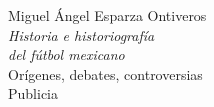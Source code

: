 \documentclass[11pt,a5paper,twoside]{book} %
\begin{document}
\setcounter{page}{1} %
\parindent=5mm %
\parskip=0mm %



%



\pagestyle{empty}
\begin{titlepage}
\begin{flushright}
\setcounter{page}{1}
\biolinum
\large Miguel Ángel Esparza Ontiveros\\
\vspace{12pt}
\huge \emph{Historia e historiografía}\\
\huge \emph{del fútbol mexicano} \\
\vspace{12pt}
\large Orígenes, debates, controversias \\
\vfill
\large Publicia \\
\end{flushright}
\end{titlepage}


\newpage
\pagestyle{empty}
\null\vfill
{}
\end{document}
